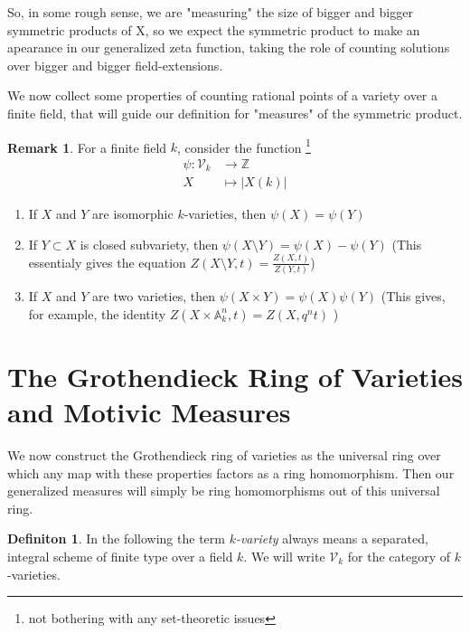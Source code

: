 \documentclass[11pt, a4paper, german]{article}
\theoremstyle{plain}
\theoremstyle{definition}
\newtheorem{definition}[theorem]{Definiton}
\newtheorem{remark}[theorem]{Remark}
\begin{document}
So, in some rough sense, we are "measuring" the size of bigger and bigger symmetric products of X, so we expect the symmetric product
to make an apearance in our generalized zeta function, taking the role of counting solutions over bigger and bigger field-extensions.

We now collect some properties of counting rational points of a variety over a finite field, that will guide our definition for "measures" 
of the symmetric product.

\begin{remark}
    For a finite field $k$, consider the function \footnote{not bothering with any set-theoretic issues} 
    \begin{align*}
        \psi: \mathcal{V}_k & \to   \mathbb{Z}\\
        X & \mapsto |X(k)|
    \end{align*}
    \begin{enumerate}
        \item If $X$ and $Y$ are isomorphic $k$-varieties, then $\psi(X) = \psi(Y)$
        \item If $Y \subset X$ is closed subvariety, then $\psi(X \setminus Y) = \psi(X) - \psi(Y)$ 
              (This essentialy gives the equation $Z(X \setminus Y, t) = \frac{Z(X, t)}{Z(Y,t)}$)
        \item If $X$ and $Y$ are two varieties, then $\psi(X \times Y) = \psi(X)\psi(Y)$
              (This gives, for example, the identity $Z(X \times \mathbb{A}^n_k, t) = Z(X, q^nt)$ )
    \end{enumerate}
\end{remark}


\section{The Grothendieck Ring of Varieties and Motivic Measures}

We now construct the Grothendieck ring of varieties as the universal ring over which any map with these properties factors as a 
ring homomorphism. Then our generalized measures will simply be ring homomorphisms out of this universal ring.

\begin{definition}
    In the following the term \emph{$k$-variety} always means a separated, integral scheme of finite type over a field $k$.
    We will write $\mathcal{V}_k$ for the category of $k$-varieties.
\end{definition}
\end{document}
